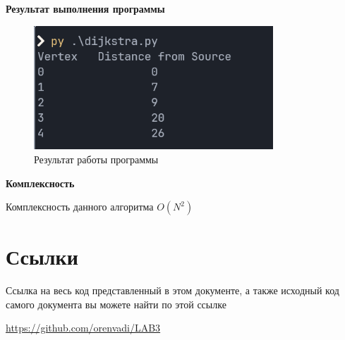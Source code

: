 \textbf{Результат выполнения программы}

\begin{figure}[H]
    \centering
    \includegraphics[width=0.8\textwidth]{./flowcharts/result.png}
    \caption{Результат работы программы}
\end{figure}


\textbf{Комплексность}

Комплексность данного алгоритма $O(N^2)$


\section{Ссылки}
Ссылка на весь код представленный в этом документе, а также исходный код самого документа вы можете найти по этой ссылке

\href{https://github.com/orenvadi/LAB3}{https://github.com/orenvadi/LAB3}




